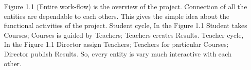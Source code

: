 \documentclass[../main.tex]{subfiles}
\begin{document}
\newline
Figure 1.1 (Entire work-flow) is the overview of the project. Connection of all the entities are dependable to each others.  This gives the simple idea about the functional activities of the project. 
\newline
Student cycle, In the Figure 1.1 Student takes Courses; Courses is guided by Teachers; Teachers creates Results. 
\newline
Teacher cycle, In the Figure 1.1 Director assign Teachers; Teachers for particular Courses; Director publish Results.
\newline
So, every entity is vary much interactive with each other.
\end{document}
